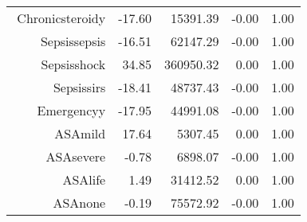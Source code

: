 \begin{tabular}{rrrrr}
$$  Chronic\-steroid\-y & -17.60 & 15391.39 & -0.00 & 1.00 \\ 
  Sepsis\-sepsis & -16.51 & 62147.29 & -0.00 & 1.00 \\ 
  Sepsis\-shock & 34.85 & 360950.32 & 0.00 & 1.00 \\ 
  Sepsis\-sirs & -18.41 & 48737.43 & -0.00 & 1.00 \\ 
  Emergency\-y & -17.95 & 44991.08 & -0.00 & 1.00 \\ 
  ASA\-mild & 17.64 & 5307.45 & 0.00 & 1.00 \\ 
  ASA\-severe & -0.78 & 6898.07 & -0.00 & 1.00 \\ 
  ASA\-life & 1.49 & 31412.52 & 0.00 & 1.00 \\ 
  ASA\-none & -0.19 & 75572.92 & -0.00 & 1.00 \\ 
   \hline
\end{tabular}

